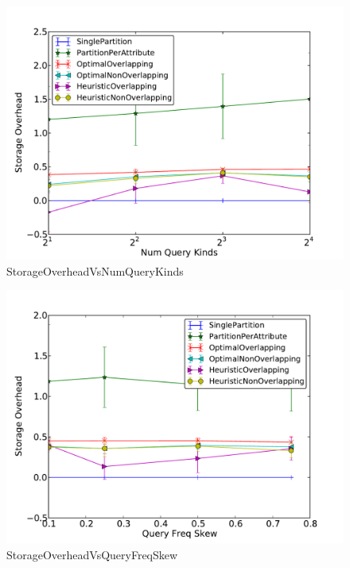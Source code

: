 \begin{figure}[ht]
\centerline{\includegraphics[width=0.9\columnwidth]{figures/StorageOverheadVsNumQueryKinds.pdf}}
\caption{StorageOverheadVsNumQueryKinds}
\end{figure}

\begin{figure}[ht]
\centerline{\includegraphics[width=0.9\columnwidth]{figures/StorageOverheadVsQueryFreqSkew.pdf}}
\caption{StorageOverheadVsQueryFreqSkew}
\end{figure}

